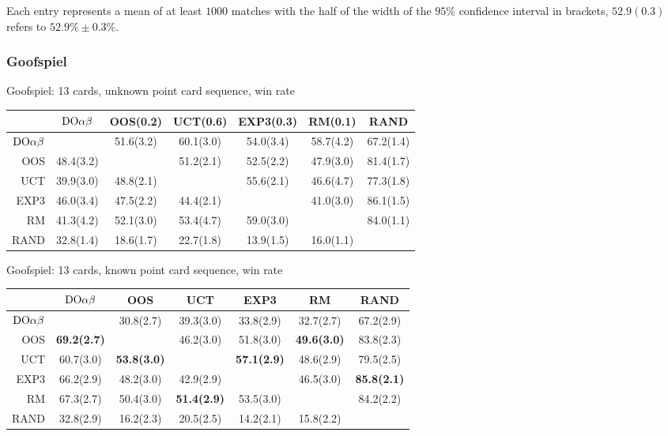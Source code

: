 Each entry represents a mean of at least $1000$ matches with the half of the width of the $95\%$ confidence interval in brackets, \eg $52.9(0.3)$ refers to $52.9\% \pm 0.3\%$.

\subsubsection{Goofspiel}

\begin{table}
\centering
\begin{scriptsize}

Goofspiel: 13 cards, unknown point card sequence, win rate
\begin{tabular}{|r|cccccc|}\hline
&$\textrm{DO}\alpha\beta$&OOS(0.2)&UCT(0.6)&EXP3(0.3)&RM(0.1)&RAND\\\hline
$\textrm{DO}\alpha\beta$&&51.6(3.2)&60.1(3.0)&54.0(3.4)&58.7(4.2)&67.2(1.4)\\
OOS&48.4(3.2)&&51.2(2.1)&52.5(2.2)&47.9(3.0)&81.4(1.7)\\
UCT&39.9(3.0)&48.8(2.1)&&55.6(2.1)&46.6(4.7)&77.3(1.8)\\
EXP3&46.0(3.4)&47.5(2.2)&44.4(2.1)&&41.0(3.0)&86.1(1.5)\\
RM&41.3(4.2)&52.1(3.0)&53.4(4.7)&59.0(3.0)&&84.0(1.1)\\
RAND&32.8(1.4)&18.6(1.7)&22.7(1.8)&13.9(1.5)&16.0(1.1)&\\
\hline
\end{tabular}

Goofspiel: 13 cards, known point card sequence, win rate
\begin{tabular}{|r|cccccc|}\hline
&$\textrm{DO}\alpha\beta$&OOS&UCT&EXP3&RM&RAND\\\hline
$\textrm{DO}\alpha\beta$&&30.8(2.7)&39.3(3.0)&33.8(2.9)&32.7(2.7)&67.2(2.9)\\
OOS&\textbf{69.2(2.7)}&&46.2(3.0)&51.8(3.0)&\textbf{49.6(3.0)}&83.8(2.3)\\
UCT&60.7(3.0)&\textbf{53.8(3.0)}&&\textbf{57.1(2.9)}&48.6(2.9)&79.5(2.5)\\
EXP3&66.2(2.9)&48.2(3.0)&42.9(2.9)&&46.5(3.0)&\textbf{85.8(2.1)}\\
RM&67.3(2.7)&50.4(3.0)&\textbf{51.4(2.9)}&53.5(3.0)&&84.2(2.2)\\
RAND&32.8(2.9)&16.2(2.3)&20.5(2.5)&14.2(2.1)&15.8(2.2)&\\
\hline
\end{tabular}


\end{scriptsize}
\end{table}
